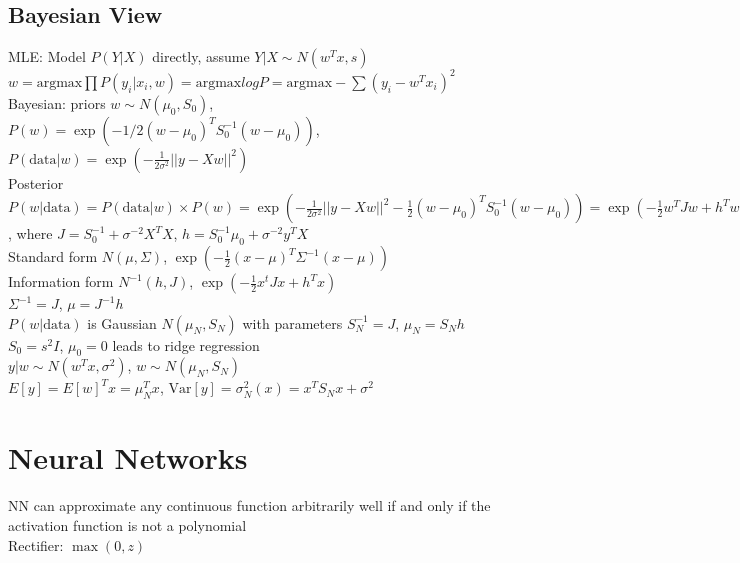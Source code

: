 \subsection*{Bayesian View}

MLE: Model $P(Y|X)$ directly, assume $Y | X \sim N(w^T x, s)$\\
$w = \text{argmax} \prod P(y_i|x_i, w) = \text{argmax} log P = \text{argmax} - \sum (y_i - w^T x_i)^2$\\

Bayesian: priors $w \sim N(\mu_0, S_0)$, $P(w) = \exp (-1/2 (w - \mu_0)^T S_0^{-1} (w - \mu_0))$, $P(\text{data}|w) = \exp(-\frac{1}{2\sigma^2} ||y - X w||^2)$\\
Posterior $P(w|\text{data}) = P(\text{data}|w) \times P(w) = \exp(-\frac{1}{2\sigma^2} ||y - X w||^2 - \frac{1}{2}(w - \mu_0)^T S_0^{-1}(w-\mu_0)) = \exp(-\frac{1}{2} w^T J w + h^T w)$, where $J = S_0^{-1} + \sigma^{-2} X^T X$, $h = S_0^{-1}\mu_0 + \sigma^{-2} y^T X$\\
Standard form $N(\mu, \Sigma)$, $\exp(-\frac{1}{2}(x-\mu)^T\Sigma^{-1}(x-\mu))$\\
Information form $N^{-1}(h, J)$, $\exp(-\frac{1}{2}x^t J x + h^T x)$\\
$\Sigma^{-1} = J$, $\mu = J^{-1} h$\\
$P(w|\text{data})$ is Gaussian $N(\mu_N, S_N)$ with parameters $S_N^{-1} = J$, $\mu_N = S_N h$\\
$S_0 = s^2I$, $\mu_0 = 0$ leads to ridge regression\\
$y|w \sim N(w^T x, \sigma^2)$, $w \sim N(\mu_N, S_N)$\\
$E[y] = E[w]^T x = \mu_N^T x$, $\text{Var}[y] = \sigma_N^2(x) = x^T S_N x + \sigma^2$

\section{Neural Networks}

NN can approximate any continuous function arbitrarily well if and only if the activation function is not a polynomial\\
Rectifier: $\max(0, z)$\\


